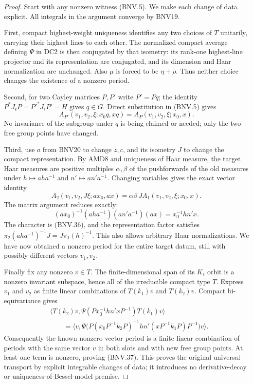 \documentclass[11pt,a4paper]{article}
\numberwithin{equation}{section}
\theoremstyle{remark}\newtheorem{remark}[theorem]{Remark}
\begin{document}
\begin{proof}
Start with any nonzero witness (BNV.5).  We make each change of data
explicit.  All integrals in the argument converge by BNV19.

First, compact highest-weight uniqueness identifies any two choices
of $T$ unitarily, carrying their highest lines to each other.  The
normalized compact average defining $\Psi$ in DC2 is then conjugated
by that isometry: its rank-one highest-line projector and its
representation are conjugated, and its dimension and Haar normalization
are unchanged.  Also $\mu$ is forced to be $\eta+\rho$.  Thus neither
choice changes the existence of a nonzero period.

Second, for two Cayley matrices $P,P'$ write $P'=Pq$; the identity
$P^*J_\epsilon P=P'^*J_\epsilon P'=H$ gives $q\in G$.
Direct substitution in (BNV.5) gives
\[
 A_{P'}(v_1,v_2,\xi;x_0q,xq)
           =A_P(v_1,v_2,\xi;x_0,x).
 \tag{BNV.38}
\]
No invariance of the subgroup under $q$ is being claimed or needed;
only the two free group points have changed.

Third, use $a$ from BNV20 to change $z,c$, and its isometry $J$ to
change the compact representation.  By AMD8 and uniqueness of Haar
measure, the target Haar measures are positive multiples
$\alpha,\beta$ of the pushforwards of the old measures under
$h\mapsto aha^{-1}$ and $n'\mapsto an'a^{-1}$.
Changing variables gives the exact vector identity
\[
 A_2(v_1,v_2,J\xi;ax_0,ax)
       =\alpha\beta\,J A_1(v_1,v_2,\xi;x_0,x).
 \tag{BNV.39}
\]
The matrix argument reduces exactly:
\[
 (ax_0)^{-1}(aha^{-1})(an'a^{-1})(ax)=x_0^{-1}hn'x.
\]
The character is (BNV.36), and the representation factor satisfies
$\pi_2(aha^{-1})^{-1}J=J\pi_1(h)^{-1}$.
This also allows arbitrary Haar normalizations.  We have now obtained
a nonzero period for the entire target datum, still with possibly
different vectors $v_1,v_2$.

Finally fix any nonzero $v\in T$.  The finite-dimensional span of its
$K_\epsilon$ orbit is a nonzero invariant subspace, hence all of the
irreducible compact type $T$.  Express $v_1$ and $v_2$ as finite linear
combinations of $T(k_1)v$ and $T(k_2)v$.  Compact bi-equivariance gives
\[
 \begin{split}
 &\langle T(k_2)v,\Psi(Px_0^{-1}hn'xP^{-1})T(k_1)v\rangle\\
 &\qquad=\langle v,
 \Psi\bigl(P(x_0P^{-1}k_2P)^{-1}hn'(xP^{-1}k_1P)P^{-1}\bigr)v\rangle.
 \end{split}
\]
Consequently the known nonzero vector period is a finite linear
combination of periods with the same vector $v$ in both slots and
with new free group points.  At least one term is nonzero, proving
(BNV.37).  This proves the original universal transport by explicit
integrable changes of data; it introduces no derivative-decay or
uniqueness-of-Bessel-model premise.
\end{proof}
\end{document}
